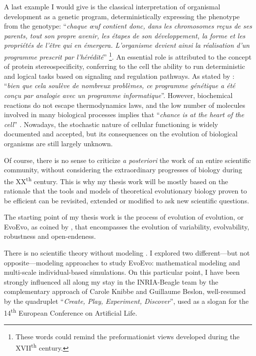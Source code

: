 A last example I would give is the classical interpretation of organismal development as a genetic program, deterministically expressing the phenotype from the genotype:
``\textit{chaque \oe uf contient donc, dans les chromosomes re\c cus de ses parents, tout son propre avenir, les \'etapes de son d\'eveloppement, la forme et les propri\'et\'es de l'\^etre qui en \'emergera. L'organisme devient ainsi la r\'ealisation d'un programme prescrit par l'h\'er\'edit\'e}'' \citep{jacob-1970}\footnote{These words could remind the preformationist views developed during the XVII\textsuperscript{th} century.}.
An essential role is attributed to the concept of protein stereospecificity, conferring to the cell the ability to run deterministic and logical tasks based on signaling and regulation pathways. As stated by \cite{kupiec-2008}: ``\textit{bien que cela soul\`eve de nombreux probl\`emes, ce programme g\'{e}n\'{e}tique a \'{e}t\'{e} con\c cu par analogie avec un programme informatique}''. However, biochemical reactions do not escape thermodynamics laws, and the low number of molecules involved in many biological processes implies that ``\textit{chance is at the heart of the cell}'' \citep{gandrillon-et-al-2012}. Nowadays, the stochastic nature of cellular functioning is widely documented and accepted, but its consequences on the evolution of biological organisms are still largely unknown.

Of course, there is no sense to criticize \textit{a posteriori} the work of an entire scientific community, without considering the extraordinary progresses of biology during the XX\textsuperscript{th} century.
This is why my thesis work will be mostly based on the rationale that the tools and models of theoretical evolutionary biology proven to be efficient can be revisited, extended or modified to ask new scientific questions.

The starting point of my thesis work is the process of evolution of evolution, or EvoEvo, as coined by \cite{hindre-et-al-2012}, that encompasses the evolution of variability, evolvability, robustness and open-endeness.

There is no scientific theory without modeling \citep{servedio-et-al-2014}. I explored two different---but not opposite---modeling approaches to study EvoEvo: mathematical modeling and multi-scale individual-based simulations. On this particular point, I have been strongly influenced all along my stay in the INRIA-Beagle team by the complementary approach of Carole Knibbe and Guillaume Beslon, well-resumed by the quadruplet ``\textit{Create, Play, Experiment, Discover}'', used as a slogan for the 14\textsuperscript{th} European Conference on Artificial Life.

